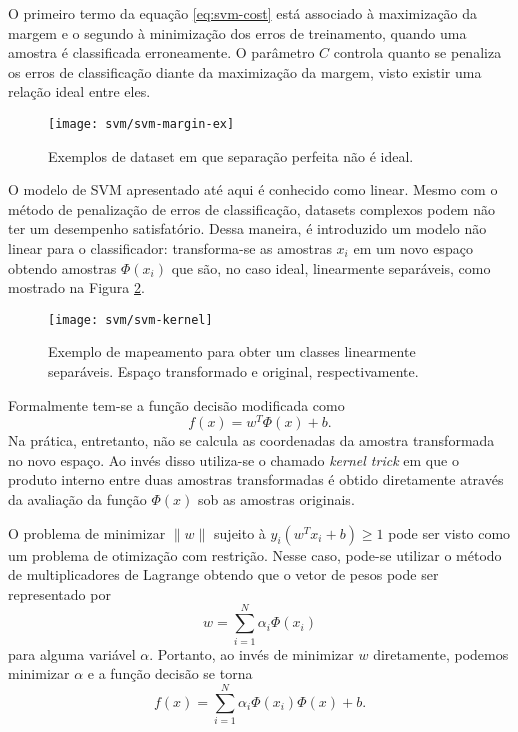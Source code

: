 O primeiro termo da equação \eqref{eq:svm-cost} está associado à maximização da margem e o segundo à minimização dos erros de treinamento, quando uma amostra é classificada erroneamente. O parâmetro $C$ controla quanto se penaliza os erros de classificação diante da maximização da margem, visto existir uma relação ideal entre eles.

\begin{figure}
\centering
\texttt{[image: svm/svm-margin-ex]}
\caption{Exemplos de dataset em que separação perfeita não é ideal.}
\label{fig:svm-margin-ex}
\end{figure}

O modelo de SVM apresentado até aqui é conhecido como linear. Mesmo com o método de penalização de erros de classificação, datasets complexos podem não ter um desempenho satisfatório. Dessa maneira, é introduzido um modelo não linear para o classificador: transforma-se as amostras $x_i$ em um novo espaço obtendo amostras $\Phi(x_i)$ que são, no caso ideal, linearmente separáveis, como mostrado na Figura \ref{fig:svm-kernel}.

\begin{figure}
\centering
\texttt{[image: svm/svm-kernel]}
\caption{Exemplo de mapeamento para obter um classes linearmente separáveis. Espaço transformado e original, respectivamente.}
\label{fig:svm-kernel}
\end{figure}

Formalmente tem-se a função decisão modificada como
\begin{equation*}
f(x)=w^T \Phi(x) +b.
\end{equation*}
Na prática, entretanto, não se calcula as coordenadas da amostra transformada no novo espaço. Ao invés disso utiliza-se o chamado \textit{kernel trick} \cite{bishop2007} em que o produto interno entre duas amostras transformadas é obtido diretamente através da avaliação da função $\Phi(x)$ sob as amostras originais.

O problema de minimizar $\|w\|$ sujeito à $y_i(w^T x_i+b) \geq 1$ pode ser visto como um problema de otimização com restrição. Nesse caso, pode-se utilizar o método de multiplicadores de Lagrange \cite{bishop2007} obtendo que o vetor de pesos pode ser representado por
\begin{equation}
	w=\sum_{i=1}^N \alpha_i \Phi(x_i)
\end{equation}
para alguma variável $\alpha$. Portanto, ao invés de minimizar $w$ diretamente, podemos minimizar $\alpha$ e a função decisão se torna
\begin{equation}
	\label{eq:svm-decision-func}
	f(x)=\sum_{i=1}^N \alpha_i \Phi(x_i) \Phi(x) +b.
\end{equation}

